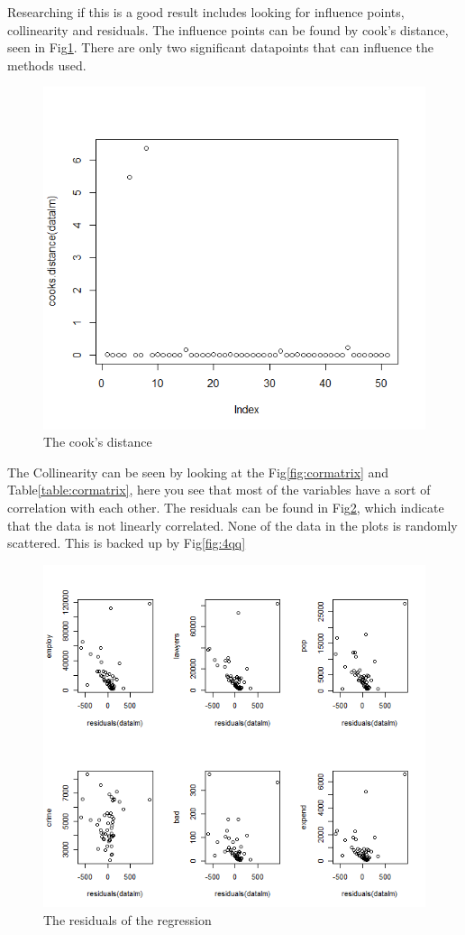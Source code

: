 \documentclass{article}
\begin{document}
    Researching if this is a good result includes looking for influence points, collinearity and residuals.
    The influence points can be found by cook's distance, seen in Fig\ref{fig:4cook}.
    There are only two significant datapoints that can influence the methods used.
    \begin{figure}
        \centering
        \includegraphics[scale=0.4]{../results/4_cook.png}
        \caption{The cook's distance}
        \label{fig:4cook}
    \end{figure}
    The Collinearity can be seen by looking at the Fig\ref{fig:cormatrix} and Table\ref{table:cormatrix}, here you see that 
    most of the variables have a sort of correlation with each other.
    The residuals can be found in Fig\ref{fig:4res}, which indicate that the data is not linearly correlated.
    None of the data in the plots is randomly scattered.
    This is backed up by Fig\ref{fig:4qq}
    \begin{figure}
        \centering
        \includegraphics[scale=0.4]{../results/4_res.png}
        \caption{The residuals of the regression}
        \label{fig:4res}
    \end{figure}
\end{document}
